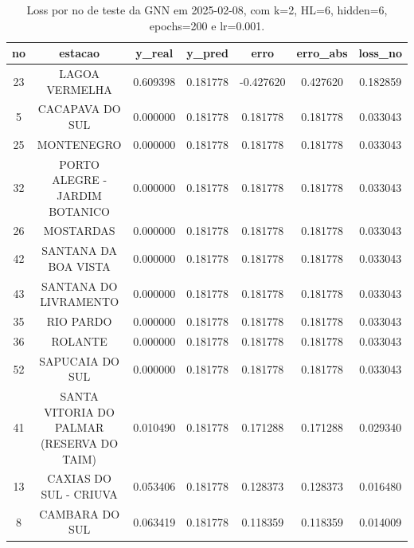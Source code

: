 \begin{table}[h]
\centering
\caption{Loss por no de teste da GNN em 2025-02-08, com k=2, HL=6, hidden=6, epochs=200 e lr=0.001.}
\label{tab:gnn_loss_k2_hl6_h6_e200_d20250208}
\begin{tabular}{ccccccc}
\toprule
no & estacao & y\_real & y\_pred & erro & erro\_abs & loss\_no \\
\midrule
23 & LAGOA VERMELHA & 0.609398 & 0.181778 & -0.427620 & 0.427620 & 0.182859 \\
5 & CACAPAVA DO SUL & 0.000000 & 0.181778 & 0.181778 & 0.181778 & 0.033043 \\
25 & MONTENEGRO & 0.000000 & 0.181778 & 0.181778 & 0.181778 & 0.033043 \\
32 & PORTO ALEGRE - JARDIM BOTANICO & 0.000000 & 0.181778 & 0.181778 & 0.181778 & 0.033043 \\
26 & MOSTARDAS & 0.000000 & 0.181778 & 0.181778 & 0.181778 & 0.033043 \\
42 & SANTANA DA BOA VISTA & 0.000000 & 0.181778 & 0.181778 & 0.181778 & 0.033043 \\
43 & SANTANA DO LIVRAMENTO & 0.000000 & 0.181778 & 0.181778 & 0.181778 & 0.033043 \\
35 & RIO PARDO & 0.000000 & 0.181778 & 0.181778 & 0.181778 & 0.033043 \\
36 & ROLANTE & 0.000000 & 0.181778 & 0.181778 & 0.181778 & 0.033043 \\
52 & SAPUCAIA DO SUL & 0.000000 & 0.181778 & 0.181778 & 0.181778 & 0.033043 \\
41 & SANTA VITORIA DO PALMAR (RESERVA DO TAIM) & 0.010490 & 0.181778 & 0.171288 & 0.171288 & 0.029340 \\
13 & CAXIAS DO SUL - CRIUVA & 0.053406 & 0.181778 & 0.128373 & 0.128373 & 0.016480 \\
8 & CAMBARA DO SUL & 0.063419 & 0.181778 & 0.118359 & 0.118359 & 0.014009 \\
\bottomrule
\end{tabular}
\end{table}
